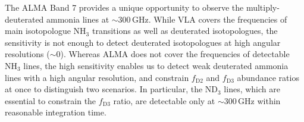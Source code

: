 \documentclass[12pt,a4paper]{article}  %
\newcommand{\ammonia}{NH$_3$\xspace}
\begin{document}
The ALMA Band 7 provides a unique opportunity to observe the multiply-deuterated ammonia lines at $\sim$300\,GHz. While VLA covers the frequencies of main isotopologue NH$_3$ transitions as well as deuterated isotopologues, the sensitivity is not enough to detect deuterated isotopologues at high angular resolutions ($\sim$0). Whereas ALMA does not cover the frequencies of detectable NH$_3$ lines, the high sensitivity enables us to detect weak deuterated ammonia lines with a high angular resolution, and constrain $f_\mathrm{D2}$ and $f_\mathrm{D3}$ abundance ratios at once to distinguish two scenarios. In particular, the ND$_3$ lines, which are essential to constrain the $f_\mathrm{D3}$ ratio, are detectable only at $\sim$300\,GHz within reasonable integration time. 




    
    
\end{document}
